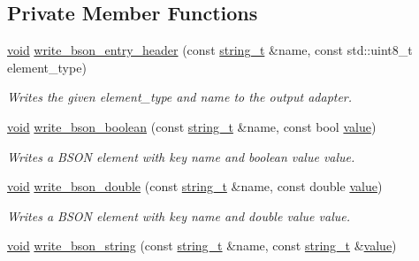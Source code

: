 \subsection*{Private Member Functions}
\begin{DoxyCompactItemize}
\item 
\hyperlink{namespacenlohmann_1_1detail_a59fca69799f6b9e366710cb9043aa77d}{void} \hyperlink{classnlohmann_1_1detail_1_1binary__writer_a1b5b7f5c03b1f8b1f59ea61db9634108}{write\+\_\+bson\+\_\+entry\+\_\+header} (const \hyperlink{classnlohmann_1_1detail_1_1binary__writer_a29f2ae7a5c4a8c1dae47b3b2310de8a8}{string\+\_\+t} \&name, const std\+::uint8\+\_\+t element\+\_\+type)
\begin{DoxyCompactList}\small\item\em Writes the given {\itshape element\+\_\+type} and {\itshape name} to the output adapter. \end{DoxyCompactList}\item 
\hyperlink{namespacenlohmann_1_1detail_a59fca69799f6b9e366710cb9043aa77d}{void} \hyperlink{classnlohmann_1_1detail_1_1binary__writer_ae099435e1df3096e0fc78333282f8f67}{write\+\_\+bson\+\_\+boolean} (const \hyperlink{classnlohmann_1_1detail_1_1binary__writer_a29f2ae7a5c4a8c1dae47b3b2310de8a8}{string\+\_\+t} \&name, const bool \hyperlink{namespacenlohmann_1_1detail_a2fb6dae6578e06ae73ca0d7cc8512b1aa2063c1608d6e0baf80249c42e2be5804}{value})
\begin{DoxyCompactList}\small\item\em Writes a B\+S\+ON element with key {\itshape name} and boolean value {\itshape value}. \end{DoxyCompactList}\item 
\hyperlink{namespacenlohmann_1_1detail_a59fca69799f6b9e366710cb9043aa77d}{void} \hyperlink{classnlohmann_1_1detail_1_1binary__writer_a263ec18815467bb9919021ef126919ca}{write\+\_\+bson\+\_\+double} (const \hyperlink{classnlohmann_1_1detail_1_1binary__writer_a29f2ae7a5c4a8c1dae47b3b2310de8a8}{string\+\_\+t} \&name, const double \hyperlink{namespacenlohmann_1_1detail_a2fb6dae6578e06ae73ca0d7cc8512b1aa2063c1608d6e0baf80249c42e2be5804}{value})
\begin{DoxyCompactList}\small\item\em Writes a B\+S\+ON element with key {\itshape name} and double value {\itshape value}. \end{DoxyCompactList}\item 
\hyperlink{namespacenlohmann_1_1detail_a59fca69799f6b9e366710cb9043aa77d}{void} \hyperlink{classnlohmann_1_1detail_1_1binary__writer_a5e6574416915208fc035b57338ae3252}{write\+\_\+bson\+\_\+string} (const \hyperlink{classnlohmann_1_1detail_1_1binary__writer_a29f2ae7a5c4a8c1dae47b3b2310de8a8}{string\+\_\+t} \&name, const \hyperlink{classnlohmann_1_1detail_1_1binary__writer_a29f2ae7a5c4a8c1dae47b3b2310de8a8}{string\+\_\+t} \&\hyperlink{namespacenlohmann_1_1detail_a2fb6dae6578e06ae73ca0d7cc8512b1aa2063c1608d6e0baf80249c42e2be5804}{value})

\end{DoxyCompactItemize}
